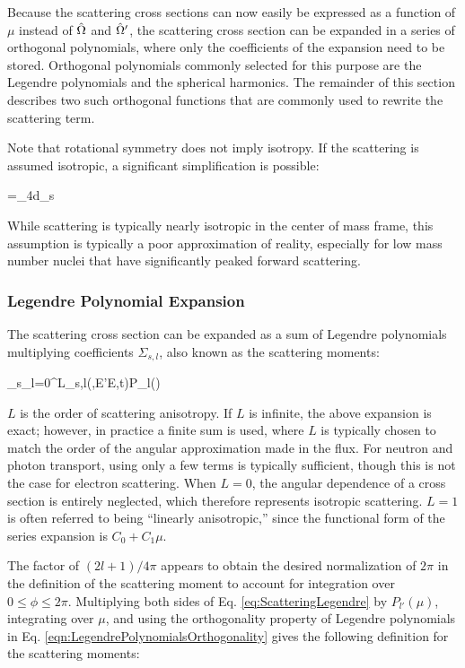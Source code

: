 Because the scattering cross sections can now easily be expressed as a function of \(\mu\) instead of \(\hat{\Omega}\) and \(\hat{\Omega}'\), the scattering cross section can be expanded in a series of orthogonal polynomials, where only the coefficients of the expansion need to be stored. Orthogonal polynomials commonly selected for this purpose are the Legendre polynomials and the spherical harmonics. The remainder of this section describes two such orthogonal functions that are commonly used to rewrite the scattering term. 

Note that rotational symmetry does not imply isotropy. If the scattering is assumed isotropic, a significant simplification is possible:

\beq
{}=\int_{4\pi}d\hO\Sigma_s\seatout
\eeq

While scattering is typically nearly isotropic in the center of mass frame, this assumption is typically a poor approximation of reality, especially for low mass number nuclei that have significantly peaked forward scattering.

\subsubsection{Legendre Polynomial Expansion}
\label{sec:LegendrePolynomialExpansion}

The scattering cross section can be expanded as a sum of Legendre polynomials multiplying coefficients \(\Sigma_{s,l}\), also known as the scattering moments:

\beq
\label{eq:ScatteringLegendre}
\Sigma_s\seatout \equiv\sum_{l=0}^L\Sigma_{s,l}(,E'\rightarrow E,t)P_l(\mu)
\eeq

\(L\) is the order of scattering anisotropy. If \(L\) is infinite, the above expansion is exact; however, in practice a finite sum is used, where \(L\) is typically chosen to match the order of the angular approximation made in the flux. For neutron and photon transport, using only a few terms is typically sufficient, though this is not the case for electron scattering. When \(L=0\), the angular dependence of a cross section is entirely neglected, which therefore represents isotropic scattering. \(L=1\) is often referred to being ``linearly anisotropic,'' since the functional form of the series expansion is \(C_0+C_1\mu\).

The factor of \((2l+1)/4\pi\) appears to obtain the desired normalization of \(2\pi\) in the definition of the scattering moment to account for integration over \(0\leq\phi\leq2\pi\). Multiplying both sides of Eq. \eqref{eq:ScatteringLegendre} by \(P_{l'}(\mu)\), integrating over \(\mu\), and using the orthogonality property of Legendre polynomials in Eq. \eqref{eqn:LegendrePolynomialsOrthogonality} gives the following definition for the scattering moments:

